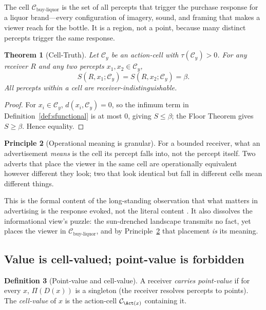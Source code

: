 \documentclass[twocolumn,11pt,a4paper]{article}
\theoremstyle{adv}
\newtheorem{theorem}{Theorem}[section]
\theoremstyle{definition}
\newtheorem{definition}[theorem]{Definition}
\newtheorem{principle}[theorem]{Principle}
\theoremstyle{remark}
\newcommand{\Cell}{\mathcal{C}}        %
\newcommand{\Dec}{D}                   %
\newcommand{\Proj}{\Pi}                %
\newcommand{\Recv}{R}                  %
\newcommand{\Sval}{S}                  %
\newcommand{\floor}{\beta}            %
\newcommand{\tol}{\tau}               %
\newcommand{\dist}{d}
\begin{document}
The cell $\Cell_{\text{buy-liquor}}$ is the set of all percepts that
trigger the purchase response for a liquor brand---every configuration of
imagery, sound, and framing that makes a viewer reach for the bottle. It
is a region, not a point, because many distinct percepts trigger the same
response.

\begin{theorem}[Cell-Truth]
\label{thm:celltruth}
Let $\Cell_y$ be an action-cell with $\tol(\Cell_y)>0$. For any receiver
$\Recv$ and any two percepts $x_1,x_2\in\Cell_y$,
\[
  \Sval(\Recv,x_1;\Cell_y)=\Sval(\Recv,x_2;\Cell_y)=\floor.
\]
All percepts within a cell are receiver-indistinguishable.
\end{theorem}

\begin{proof}
For $x_i\in\Cell_y$, $\dist(x_i,\Cell_y)=0$, so the infimum term in
Definition~\ref{def:sfunctional} is at most $0$, giving
$\Sval\le\floor$; the Floor Theorem gives $\Sval\ge\floor$. Hence equality.
\end{proof}

\begin{principle}[Operational meaning is granular]
\label{prin:granular}
For a bounded receiver, what an advertisement \emph{means} is the cell its
percept falls into, not the percept itself. Two adverts that place the
viewer in the same cell are operationally equivalent however different
they look; two that look identical but fall in different cells mean
different things.
\end{principle}

This is the formal content of the long-standing observation that what
matters in advertising is the response evoked, not the literal content
\citep{krugman1965,vakratsas1999}. It also dissolves the informational
view's puzzle: the sun-drenched landscape transmits no fact, yet places
the viewer in $\Cell_{\text{buy-liquor}}$, and by
Principle~\ref{prin:granular} that placement \emph{is} its meaning.

\subsection{Value is cell-valued; point-value is forbidden}

\begin{definition}[Point-value and cell-value]
\label{def:pointvalue}
A receiver \emph{carries point-value} if for every $x$, $\Proj(\Dec(x))$
is a singleton (the receiver resolves percepts to points). The
\emph{cell-value} of $x$ is the action-cell $\Cell_{\Act(x)}$ containing
it.
\end{definition}
\end{document}
